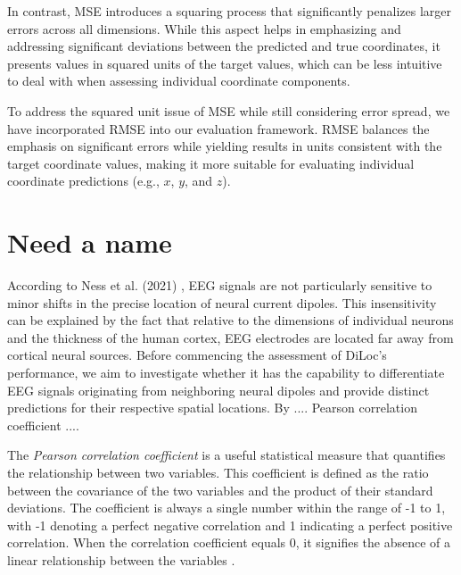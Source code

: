 \documentclass[a4paper, UKenglish, 11pt]{uiomaster}
\begin{document}
In contrast, MSE introduces a squaring process that significantly penalizes larger errors across all dimensions. While this aspect helps in emphasizing and addressing significant deviations between the predicted and true coordinates, it presents values in squared units of the target values, which can be less intuitive to deal with when assessing individual coordinate components.

To address the squared unit issue of MSE while still considering error spread, we have incorporated RMSE into our evaluation framework. RMSE balances the emphasis on significant errors while yielding results in units consistent with the target coordinate values, making it more suitable for evaluating individual coordinate predictions (e.g., $x$, $y$, and $z$).

%
%


\section{Need a name}
According to Ness et al. (2021) \cite{naess2021biophysically}, EEG signals are not particularly sensitive to minor shifts in the precise location of neural current dipoles. This insensitivity can be explained by the fact that relative to the dimensions of individual neurons and the thickness of the human cortex, EEG electrodes are located far away from cortical neural sources. Before commencing the assessment of DiLoc's performance, we aim to investigate whether it has the capability to differentiate EEG signals originating from neighboring neural dipoles and provide distinct predictions for their respective spatial locations. By .... Pearson correlation coefficient ....

The \emph{Pearson correlation coefficient} is a useful statistical measure that quantifies the relationship between two variables. This coefficient is defined as the ratio between the covariance of the two variables and the product of their standard deviations. The coefficient is always a single number within the range of -1 to 1, with -1 denoting a perfect negative correlation and 1 indicating a perfect positive correlation. When the correlation coefficient equals 0, it signifies the absence of a linear relationship between the variables \cite{numpy-docs}.
\end{document}

